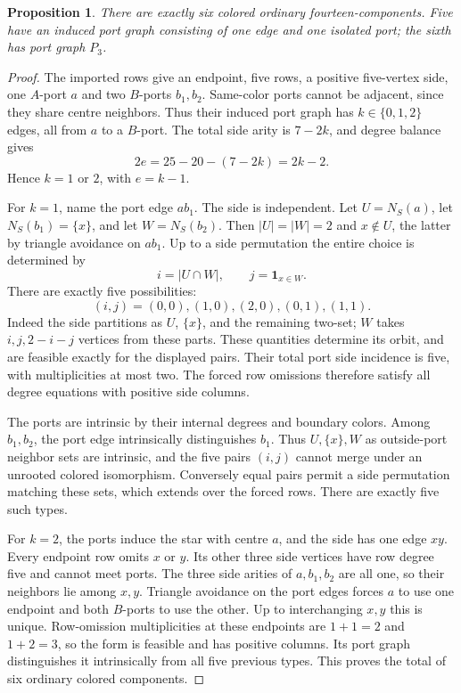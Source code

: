 \documentclass[11pt]{article}
\newtheorem{proposition}[theorem]{Proposition}
\begin{document}
\begin{proposition}\label{k23fourteen}
There are exactly six colored ordinary fourteen-components. Five have
an induced port graph consisting of one edge and one isolated port;
the sixth has port graph $P_3$.
\end{proposition}
\begin{proof}
The imported rows give an endpoint, five rows, a positive five-vertex
side, one $A$-port $a$ and two $B$-ports $b_1,b_2$. Same-color ports
cannot be adjacent, since they share centre neighbors. Thus their
induced port graph has $k\in\{0,1,2\}$ edges, all from $a$ to a $B$-port.
The total side arity is $7-2k$, and degree balance gives
\[
 2e=25-20-(7-2k)=2k-2.
\]
Hence $k=1$ or $2$, with $e=k-1$.

For $k=1$, name the port edge $ab_1$. The side is independent. Let
$U=N_S(a)$, let $N_S(b_1)=\{x\}$, and let $W=N_S(b_2)$. Then
$|U|=|W|=2$ and $x\notin U$, the latter by triangle avoidance on
$ab_1$. Up to a side permutation the entire choice is determined by
\[
 i=|U\cap W|,\qquad j=\mathbf1_{x\in W}.
\]
There are exactly five possibilities:
\[
 (i,j)=(0,0),(1,0),(2,0),(0,1),(1,1).
\]
Indeed the side partitions as $U$, $\{x\}$, and the remaining two-set;
$W$ takes $i,j,2-i-j$ vertices from these parts. These quantities
determine its orbit, and are feasible exactly for the displayed pairs.
Their total port side incidence is five, with multiplicities at most
two. The forced row omissions therefore satisfy all degree equations
with positive side columns.

The ports are intrinsic by their internal degrees and boundary colors.
Among $b_1,b_2$, the port edge intrinsically distinguishes $b_1$.
Thus $U,\{x\},W$ as outside-port neighbor sets are intrinsic, and the
five pairs $(i,j)$ cannot merge under an unrooted colored isomorphism.
Conversely equal pairs permit a side permutation matching these sets,
which extends over the forced rows. There are exactly five such types.

For $k=2$, the ports induce the star with centre $a$, and the side has
one edge $xy$. Every endpoint row omits $x$ or $y$. Its other three
side vertices have row degree five and cannot meet ports. The three
side arities of $a,b_1,b_2$ are all one, so their neighbors lie among
$x,y$. Triangle avoidance on the port edges forces $a$ to use one
endpoint and both $B$-ports to use the other. Up to interchanging $x,y$
this is unique. Row-omission multiplicities at these endpoints are
$1+1=2$ and $1+2=3$, so the form is feasible and has positive columns.
Its port graph distinguishes it intrinsically from all five previous
types. This proves the total of six ordinary colored components.
\end{proof}
\end{document}
